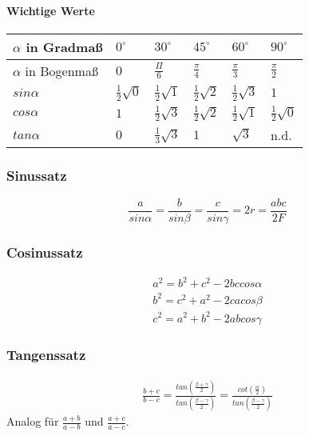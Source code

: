 \documentclass[12pt,a4paper]{article}%
\numberwithin{equation}{section}
\newcommand{\subsubsubsection}{\paragraph}
\numberwithin{equation}{subsection}
\begin{document}
	  \subsubsubsection{Wichtige Werte}
	  \renewcommand{\arraystretch}{1.5}
	  \begin{tabular}{|p{3.2cm}|p{1.8cm}|p{1.8cm}|p{1.8cm}|p{1.8cm}|p{1.8cm}|}\hline
	  $\alpha$ in Gradmaß & $0^{\circ}$ & $30^{\circ}$ & $45^{\circ}$ & $60^{\circ}$ & $90^{\circ}$ \\ \hline
	  $\alpha$ in Bogenmaß & $0$ & $\frac{\Pi}{6}$ & $\frac{\pi}{4}$ & $\frac{\pi}{3}$ & $\frac{\pi}{2}$ \\ \hline
	  $sin\alpha$ & $\frac{1}{2}\sqrt{0}$ & $\frac{1}{2}\sqrt{1}$ & $\frac{1}{2} \sqrt{2}$ & $\frac{1}{2}\sqrt{3}$ & $1$ \\ \hline
	  $cos\alpha$ & $1$ & $\frac{1}{2}\sqrt{3}$ & $\frac{1}{2}\sqrt{2}$ & $\frac{1}{2}\sqrt{1}$ & $\frac{1}{2}\sqrt{0}$ \\ \hline
	  $tan\alpha$ & $0$ & $\frac{1}{3}\sqrt{3}$ & $1$ & $\sqrt{3}$ & n.d. \\ \hline
	  \end{tabular}
	  \renewcommand{\arraystretch}{1}
	  
	  \subsubsection{Sinussatz}
	  \begin{equation}
	    \frac{a}{sin\alpha} = \frac{b}{sin\beta} = \frac{c}{sin\gamma} = 2r = \frac{abc}{2F} \label{eq:allg_sinussatz}  
	  \end{equation}
	  
	  \subsubsection{Cosinussatz}
	  \begin{align}   
	    a^2 = b^2 + c^2 - 2bc cos\alpha\\
	    b^2 = c^2 + a^2 - 2ca cos\beta\\
	    c^2 = a^2 + b^2 - 2ab cos\gamma \label{eq:trigo_cosinussatz}
	  \end{align}
	  
	  \subsubsection{Tangenssatz}
	  \begin{align}
	    \frac{b + c}{b - c} = \frac{tan\left(\frac{\beta + \gamma}{2}\right)}{tan\left(\frac{\beta - \gamma}{2}\right)} 
	    = \frac{cot\left(\frac{\alpha}{2} \right)}{tan\left(\frac{\beta - \gamma}{2}\right)}
	  \end{align}
	  Analog für $\frac{a + b}{a - b}$ und $\frac{a + c}{a - c}$.\label{eq:trigo_tangenssatz}
	  
\end{document}
